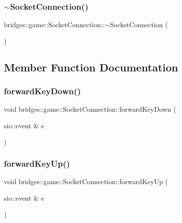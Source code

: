\subsubsection{\texorpdfstring{$\sim$SocketConnection()}{~SocketConnection()}}
{\footnotesize\ttfamily bridges\+::game\+::\+Socket\+Connection\+::$\sim$\+Socket\+Connection (\begin{DoxyParamCaption}{ }\end{DoxyParamCaption})\hspace{0.3cm}{\ttfamily [inline]}}



\subsection{Member Function Documentation}
\mbox{\label{classbridges_1_1game_1_1_socket_connection_a39433ad5880f1f01fb62ad79d58c1b56}} 
\subsubsection{\texorpdfstring{forwardKeyDown()}{forwardKeyDown()}}
{\footnotesize\ttfamily void bridges\+::game\+::\+Socket\+Connection\+::forward\+Key\+Down (\begin{DoxyParamCaption}\item[{sio\+::event \&}]{e }\end{DoxyParamCaption})\hspace{0.3cm}{\ttfamily [inline]}}

\mbox{\label{classbridges_1_1game_1_1_socket_connection_afa96ab679da2514a571359e877fd540e}} 
\subsubsection{\texorpdfstring{forwardKeyUp()}{forwardKeyUp()}}
{\footnotesize\ttfamily void bridges\+::game\+::\+Socket\+Connection\+::forward\+Key\+Up (\begin{DoxyParamCaption}\item[{sio\+::event \&}]{e }\end{DoxyParamCaption})\hspace{0.3cm}{\ttfamily [inline]}}

